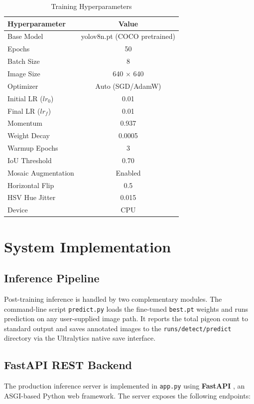 \documentclass[journal]{IEEEtran}
\begin{document}
\begin{table}[H]
\caption{Training Hyperparameters}
\label{tab:hyperparams}
\centering
\begin{tabular}{lc}
\toprule
\textbf{Hyperparameter} & \textbf{Value} \\
\midrule
Base Model          & yolov8n.pt (COCO pretrained) \\
Epochs              & 50 \\
Batch Size          & 8 \\
Image Size          & 640 $\times$ 640 \\
Optimizer           & Auto (SGD/AdamW) \\
Initial LR (\(lr_0\))& 0.01 \\
Final LR (\(lr_f\)) & 0.01 \\
Momentum            & 0.937 \\
Weight Decay        & 0.0005 \\
Warmup Epochs       & 3 \\
IoU Threshold       & 0.70 \\
Mosaic Augmentation & Enabled \\
Horizontal Flip     & 0.5 \\
HSV Hue Jitter      & 0.015 \\
Device              & CPU \\
\bottomrule
\end{tabular}
\end{table}

\section{System Implementation}
\label{sec:impl}

\subsection{Inference Pipeline}
Post-training inference is handled by two complementary modules. The command-line script \texttt{predict.py} loads the fine-tuned \texttt{best.pt} weights and runs prediction on any user-supplied image path. It reports the total pigeon count to standard output and saves annotated images to the \texttt{runs/detect/predict} directory via the Ultralytics native save interface.

\subsection{FastAPI REST Backend}
The production inference server is implemented in \texttt{app.py} using \textbf{FastAPI} \cite{fastapi}, an ASGI-based Python web framework. The server exposes the following endpoints:
\end{document}
